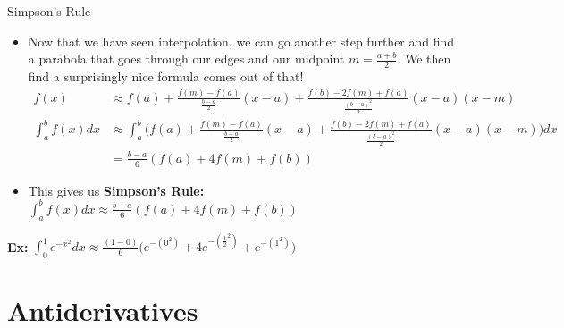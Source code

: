 {}\documentclass[letterpaper,
compress,
xcolor=x11names,
]{beamer}
\begin{document}
\begin{frame}{Simpson's Rule}
	\footnotesize
	\begin{itemize}
		\item Now that we have seen interpolation, we can go another step further and find a parabola that goes through our edges and our midpoint $m=\frac{a+b}{2}$. We then find a surprisingly nice formula comes out of that!
		\tiny{
		\begin{align*}
			\displaystyle f(x) &\approx f(a) + \frac{f(m)-f(a)}{\frac{b-a}{2}}(x-a) + \frac{f(b)-2f(m)+f(a)}{\frac{(b-a)^2}{2}}(x-a)(x-m) \\
			\int_{a}^{b}f(x)dx &\approx \int_{a}^{b}\Big(f(a) + \frac{f(m)-f(a)}{\frac{b-a}{2}}(x-a) + \frac{f(b)-2f(m)+f(a)}{\frac{(b-a)^2}{2}}(x-a)(x-m)\Big)dx \\ 
			&= \frac{b-a}{6}(f(a) + 4f(m) + f(b))
		\end{align*}}
		\footnotesize
		\item This gives us \textbf{Simpson's Rule:} $\int_{a}^{b}f(x)dx\approx \frac{b-a}{6}(f(a) + 4f(m) + f(b))$
	\end{itemize}
	\begin{center}
		\textbf{Ex:} $\displaystyle \int_{0}^{1} e^{-x^2} dx\approx\frac{(1-0)}{6}\Big(e^{-(0^2)}+4e^{-(\frac{1}{2}^2)}+e^{-(1^2)}\Big)$ 
	\end{center}
\end{frame}

\section{Antiderivatives}
\end{document}
